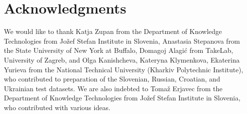 \documentclass[11pt]{article}
\begin{document}
\section*{Acknowledgments}


We would like to thank Katja Zupan from the Department of Knowledge
Technologies from Jožef Stefan Institute in Slovenia, Anastasia Stepanova from
the State University of New York at Buffalo, Domagoj Alagić from TakeLab,
University of Zagreb, and Olga Kanishcheva, Kateryna Klymenkova, Ekaterina
Yurieva from the National Technical University (Kharkiv Polytechnic Institute),
who contributed to preparation of the Slovenian, Russian, Croatian, and
Ukrainian test datasets. We are also indebted to Tomaž Erjavec from the
Department of Knowledge Technologies from Jožef Stefan Institute in Slovenia,
who contributed with various ideas.






\end{document}
